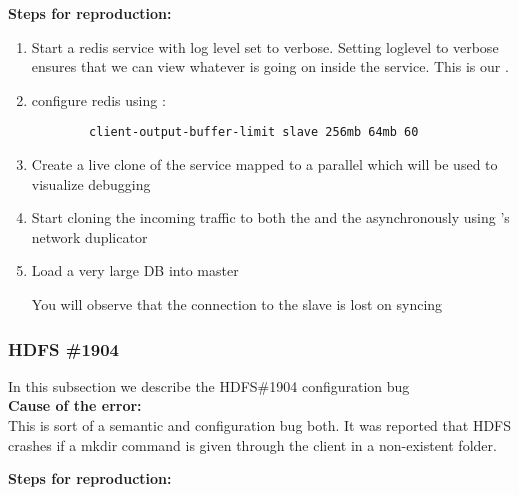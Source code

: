 \noindent \textbf{Steps for reproduction:} \\

\begin{adjustwidth}{0.5cm}{}
	\begin{enumerate}
		\item Start a redis service with log level set to verbose. Setting loglevel to verbose ensures that we can view whatever is going on inside the service. This is our \productioncontainer.
		\item configure redis using :
		
		\begin{lstlisting}
		client-output-buffer-limit slave 256mb 64mb 60
		\end{lstlisting}
		
		\item Create a live clone of the service mapped to a parallel \debugcontainer which will be used to visualize debugging
		\item Start cloning the incoming traffic to both the \productioncontainer and the \debugcontainer asynchronously using \parikshan's network duplicator
		
		\item Load a very large DB into master
		
		You will observe that the connection to the slave is lost on syncing
		
	\end{enumerate}
\end{adjustwidth}


\subsubsection{HDFS \#1904}

In this subsection we describe the HDFS\#1904 configuration bug \\

\noindent \textbf{Cause of the error:} \\

This is sort of a semantic and configuration bug both. It was reported that HDFS crashes if a mkdir command is given through the client in a non-existent folder.

\noindent \textbf{Steps for reproduction:} \\

